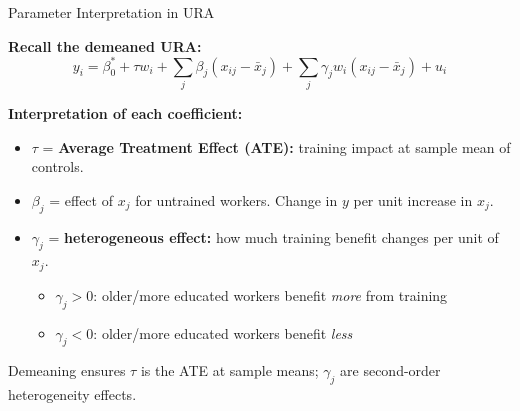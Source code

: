 \documentclass[aspectratio=169, 12pt]{beamer}
\begin{document}
\begin{frame}[shrink=25]{Parameter Interpretation in URA}

  \textbf{Recall the demeaned URA:}
  \[
    y_i = \beta_0^* + \tau w_i + \sum_j \beta_j (x_{ij} - \bar{x}_j) + \sum_j \gamma_j w_i (x_{ij} - \bar{x}_j) + u_i
  \]

  \medskip

  \textbf{Interpretation of each coefficient:}

  \begin{itemize}
    \item $\tau$ = \textbf{Average Treatment Effect (ATE):} training impact at sample mean of controls.

    \item $\beta_j$ = effect of $x_j$ for untrained workers. Change in $y$ per unit increase in $x_j$.

    \item $\gamma_j$ = \textbf{heterogeneous effect:} how much training benefit changes per unit of $x_j$.
    \begin{itemize}
      \item $\gamma_j > 0$: older/more educated workers benefit \textit{more} from training
      \item $\gamma_j < 0$: older/more educated workers benefit \textit{less}
    \end{itemize}

  \end{itemize}

  \medskip

  \begin{keybox}
    Demeaning ensures $\tau$ is the ATE at sample means; $\gamma_j$ are second-order heterogeneity effects.
  \end{keybox}

\end{frame}
\end{document}
